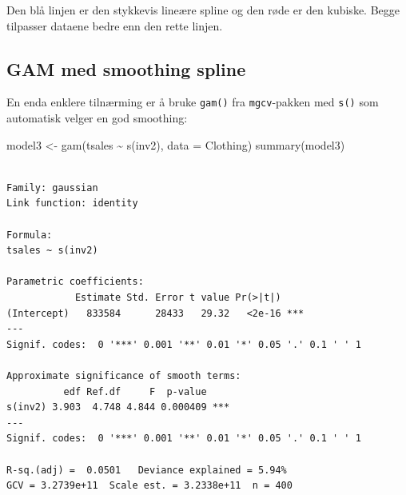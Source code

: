 \documentclass[
  letterpaper,
  DIV=11,
  numbers=noendperiod]{scrreprt}
\newenvironment{Shaded}{\begin{snugshade}}{\end{snugshade}}
\newcommand{\AttributeTok}[1]{\textcolor[rgb]{0.40,0.45,0.13}{#1}}
\newcommand{\FunctionTok}[1]{\textcolor[rgb]{0.28,0.35,0.67}{#1}}
\newcommand{\NormalTok}[1]{\textcolor[rgb]{0.00,0.23,0.31}{#1}}
\newcommand{\OtherTok}[1]{\textcolor[rgb]{0.00,0.23,0.31}{#1}}
\newcommand{\SpecialCharTok}[1]{\textcolor[rgb]{0.37,0.37,0.37}{#1}}
\begin{document}
Den blå linjen er den stykkevis lineære spline og den røde er den
kubiske. Begge tilpasser dataene bedre enn den rette linjen.

\subsection{GAM med smoothing spline}\label{gam-med-smoothing-spline}

En enda enklere tilnærming er å bruke \texttt{gam()} fra
\texttt{mgcv}-pakken med \texttt{s()} som automatisk velger en god
smoothing:

\begin{Shaded}
\begin{Highlighting}[]
\NormalTok{model3 }\OtherTok{\textless{}{-}} \FunctionTok{gam}\NormalTok{(tsales }\SpecialCharTok{\textasciitilde{}} \FunctionTok{s}\NormalTok{(inv2), }\AttributeTok{data =}\NormalTok{ Clothing)}
\FunctionTok{summary}\NormalTok{(model3)}
\end{Highlighting}
\end{Shaded}

\begin{verbatim}

Family: gaussian 
Link function: identity 

Formula:
tsales ~ s(inv2)

Parametric coefficients:
            Estimate Std. Error t value Pr(>|t|)    
(Intercept)   833584      28433   29.32   <2e-16 ***
---
Signif. codes:  0 '***' 0.001 '**' 0.01 '*' 0.05 '.' 0.1 ' ' 1

Approximate significance of smooth terms:
          edf Ref.df     F  p-value    
s(inv2) 3.903  4.748 4.844 0.000409 ***
---
Signif. codes:  0 '***' 0.001 '**' 0.01 '*' 0.05 '.' 0.1 ' ' 1

R-sq.(adj) =  0.0501   Deviance explained = 5.94%
GCV = 3.2739e+11  Scale est. = 3.2338e+11  n = 400
\end{verbatim}
\end{document}
